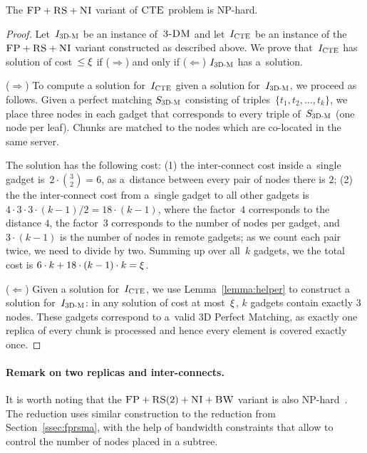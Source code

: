 \begin{theorem}
\label{theorem:fp_rs_cc}
The $\textsc{FP}+\textsc{RS}+\textsc{NI}$ variant of $\textsc{CTE}$ problem is NP-hard.
\end{theorem}
\begin{proof}
Let~$I_{\mathrm{\textsc{3D-M}}}$ be an instance of~$\textsc{3-DM}$ and let~$I_{\mathrm{\textsc{CTE}}}$ be an instance of
the~$\textsc{FP}+\textsc{RS}+\textsc{NI}$ variant constructed as described above.
We prove that~$I_{\mathrm{\textsc{CTE}}}$ has solution of cost~$\leq \xi$ if ($\Rightarrow$) and only if
($\Leftarrow$)
$I_{\mathrm{\textsc{3D-M}}}$ has a~solution.

($\Rightarrow$) To compute a solution
for~$I_{\mathrm{\textsc{CTE}}}$ given a solution for~$I_{\mathrm{\textsc{3D-M}}}$, we proceed as follows.
Given a perfect matching $S_{\mathrm{\textsc{3D-M}}}$ consisting of triples~$ \{t_1, t_2,
\ldots, t_k\}$, we place three nodes in each gadget that
corresponds to every triple of~$S_{\mathrm{\textsc{3D-M}}}$ (one node per leaf). Chunks are matched to the nodes which are co-located
in the same server.

The solution has the following cost:
(1) the inter-connect cost inside a~single gadget is~$2 \cdot {3 \choose 2} = 6$,
  as a~distance between every pair of nodes there is $2$;
  (2) the the inter-connect cost from a~single gadget to all other gadgets is~$4
  \cdot 3 \cdot 3 \cdot (k - 1) / 2 = 18\cdot (k-1)$, where the factor~$4$ corresponds to the distance $4$, the factor~$3$
  corresponds to the number of nodes per gadget, and
 ~$3 \cdot (k-1)$ is the number of nodes in remote gadgets;
  as we count each pair twice, we need to divide by two.
Summing up over all~$k$ gadgets, we the total cost is $6\cdot k + 18\cdot(k-1)\cdot k = \xi$.

($\Leftarrow$) Given a solution for~$I_{\mathrm{\textsc{CTE}}}$,
we use Lemma~\ref{lemma:helper} to construct a solution for~$I_{\mathrm{\textsc{3D-M}}}$: in any solution of cost at most~$\xi$,
$k$ gadgets contain exactly 3 nodes. These gadgets correspond to a~valid
3D Perfect Matching, as exactly one replica of every chunk is processed and
hence every element is covered exactly once.
\end{proof}

\paragraph{Remark on two replicas and inter-connects.}
It is worth noting that the $\textsc{FP}+\textsc{RS}(2)+\textsc{NI}+\textsc{BW}$ variant is also NP-hard~\cite{my-tcs}.
The reduction uses similar construction to the reduction from Section~\ref{ssec:fprsma},
with the help of bandwidth constraints that allow to control the number of nodes placed in a subtree.


